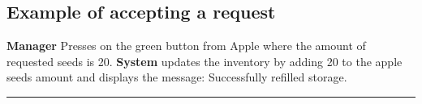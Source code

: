 \subsection{Example of accepting a request}
\textbf{Manager} Presses on the green button from Apple where the amount of
requested seeds is 20. \textbf{System} updates the inventory by adding 20 to the
apple seeds amount and displays the message: Successfully refilled storage.
\hfill
\vspace{0.5cm}
\hrule


